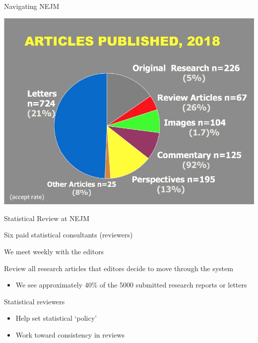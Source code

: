 \documentclass[ignorenonframetext,]{beamer}
\providecommand{\tightlist}{%
  \setlength{\itemsep}{0pt}\setlength{\parskip}{0pt}}
\begin{document}
\begin{frame}{Navigating NEJM}
\protect\hypertarget{navigating-nejm}{}

\centering

\includegraphics[width=1\textwidth,height=\textheight]{../figures/articles_published_2018.jpeg}

\end{frame}

\begin{frame}{Statistical Review at NEJM}
\protect\hypertarget{statistical-review-at-nejm}{}

Six paid statistical consultants (reviewers)

We meet weekly with the editors

Review all research articles that editors decide to move through the
system

\begin{itemize}
\tightlist
\item
  We see approximately 40\% of the 5000 submitted research reports or
  letters
\end{itemize}

Statistical reviewers

\begin{itemize}
\item
  Help set statistical `policy'
\item
  Work toward consistency in reviews
\end{itemize}

\end{frame}
\end{document}
